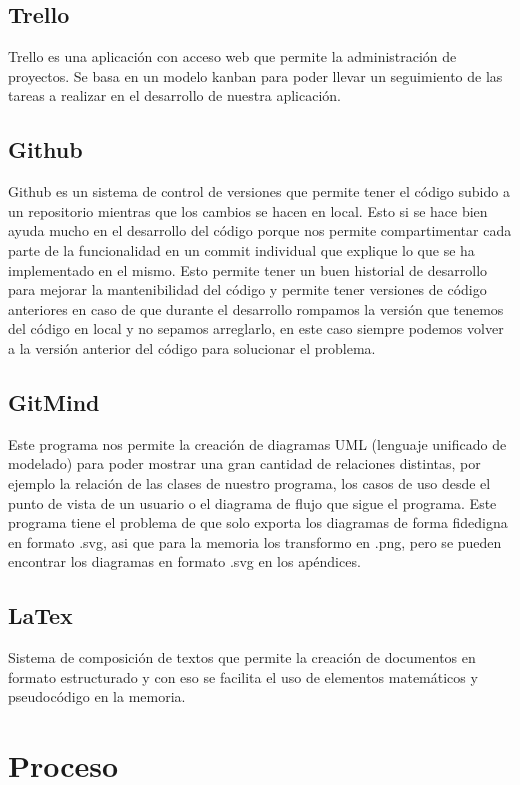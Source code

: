 \documentclass[12pt,a4paper]{article}
\begin{document}
\subsection{Trello}
Trello es una aplicación con acceso web que permite la administración de proyectos. Se basa en un modelo kanban para poder llevar un seguimiento de las tareas a realizar en el desarrollo de nuestra aplicación.\\
\subsection{Github}
Github es un sistema de control de versiones que permite tener el código subido a un repositorio mientras que los cambios se hacen en local. Esto si se hace bien ayuda mucho en el desarrollo del código porque nos permite compartimentar cada parte de la funcionalidad en un commit individual que explique lo que se ha implementado en el mismo. Esto permite tener un buen historial de desarrollo para mejorar la mantenibilidad del código y permite tener versiones de código anteriores en caso de que durante el desarrollo rompamos la versión que tenemos del código en local y no sepamos arreglarlo, en este caso siempre podemos volver a la versión anterior del código para solucionar el problema.\\
\subsection{GitMind}
Este programa nos permite la creación de diagramas UML (lenguaje unificado de modelado) para poder mostrar una gran cantidad de relaciones distintas, por ejemplo la relación de las clases de nuestro programa, los casos de uso desde el punto de vista de un usuario o el diagrama de flujo que sigue el programa. Este programa tiene el problema de que solo exporta los diagramas de forma fidedigna en formato .svg, asi que para la memoria los transformo en .png, pero se pueden encontrar los diagramas en formato .svg en los apéndices.\\
\subsection{LaTex}
Sistema de composición de textos que permite  la creación de documentos en formato estructurado y con eso se facilita el uso de elementos matemáticos y pseudocódigo en la memoria.\\
\pagebreak


		\section{Proceso}
\end{document}
